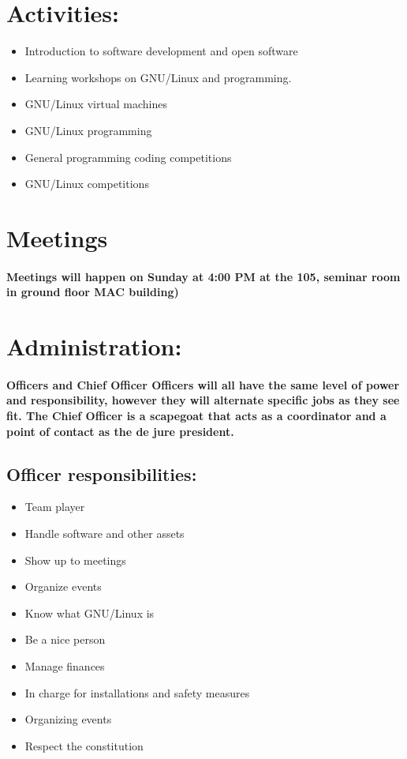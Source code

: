 \documentclass[a4paper, 11pt]{amsart}
\begin{document}
\section{Activities:}
\begin{itemize}
    \item Introduction to software development and open software
  \item Learning workshops on GNU/Linux and programming.
  \item GNU/Linux virtual machines
  \item GNU/Linux programming
  \item General programming coding competitions
  \item GNU/Linux competitions
\end{itemize}




\section{Meetings}
\paragraph{Meetings will happen on Sunday at 4:00 PM at the 105, seminar room in ground floor MAC building)}




\section{Administration:}
\paragraph{Officers and Chief Officer
	Officers will all have the same level of power and responsibility, however they will alternate specific jobs as they see fit.
	The Chief Officer is a scapegoat that acts as a coordinator and a point of contact as the de jure president.
}
\subsection{Officer responsibilities:}
\begin{itemize}
    \item Team player
    \item Handle software and other assets
    \item Show up to meetings
    \item Organize events
    \item Know what GNU/Linux is
    \item Be a nice person
    \item Manage finances
    \item In charge for installations and safety measures
    \item  Organizing events
    \item Respect the constitution
\end{itemize}
\end{document}
